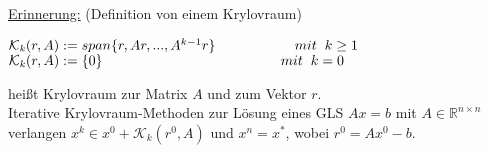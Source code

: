 \documentclass[a4paper]{letter}
\begin{document}
\underline{Erinnerung:} (Definition von einem Krylovraum)
\begin{addmargin}[20mm]{20mm}
$\mathcal{K}_{\mathit{k}}(r, A) := span\{r, Ar, ..., A^{k-1}r\} \hspace{20mm} mit \hspace{2mm} k \ge 1$
\\$\mathcal{K}_{\mathit{k}}(r, A) := \{0\} \hspace{45mm} mit \hspace{2mm} k = 0$
\end{addmargin}
hei{\ss}t Krylovraum zur Matrix $A$ und zum Vektor $r$.
\\Iterative Krylovraum-Methoden zur L\"osung eines GLS $Ax = b$ mit $A \in \mathbb{R}^{n \times n}$ verlangen $x^k \in x^{0} + \mathcal{K}_{\mathit{k}}(r^{0}, A)$ und $x^{n} = x^{*}$, wobei $r^{0} = Ax^{0} - b$.
\end{document}
